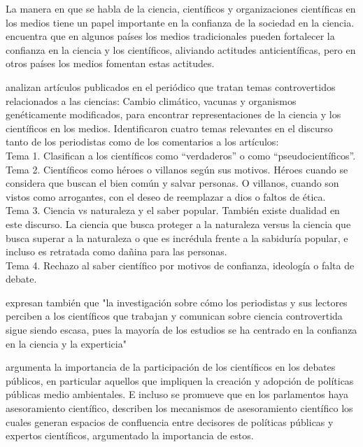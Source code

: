 \documentclass[11pt,a4paper]{article}
\begin{document}
\begin{enumerate}
		La manera en que se habla de la ciencia, científicos y organizaciones científicas en los medios tiene un papel importante en la confianza de la sociedad en la ciencia. \cite{Mede2022} encuentra que en algunos países los medios tradicionales pueden fortalecer  la confianza en la ciencia y los científicos, aliviando actitudes anticientíficas, pero en otros países los medios fomentan estas actitudes. 
		
		\cite{Donois2025} analizan artículos publicados en el periódico que tratan temas controvertidos relacionados a las ciencias: Cambio climático, vacunas y organismos genéticamente modificados, para encontrar representaciones de la ciencia y los científicos en los medios.  Identificaron cuatro temas relevantes en el discurso tanto de los periodistas como de los comentarios a los artículos: \\
		Tema 1. Clasifican a los científicos como ``verdaderos'' o como ``pseudocientíficos''. \\
		Tema 2. Científicos como héroes o villanos según sus motivos. Héroes cuando se considera que buscan el bien común y salvar personas. O villanos, cuando son vistos como arrogantes, con el deseo de reemplazar a dios o faltos de ética.\\
		Tema 3. Ciencia vs naturaleza y el saber popular. También existe dualidad en este discurso. La ciencia que busca proteger a la naturaleza versus la ciencia que busca superar a la naturaleza o que es incrédula frente a la sabiduría popular, e incluso es retratada como dañina para las personas.\\
		Tema 4. Rechazo al saber científico por motivos de confianza, ideología o falta de debate.
		
		\cite{Donois2025} expresan también que "la investigación sobre cómo los periodistas y sus lectores perciben a los científicos que trabajan y comunican sobre ciencia controvertida sigue siendo escasa, pues la mayoría de los estudios se ha centrado en la confianza en la ciencia y la experticia"
		
		 \cite{Peer2025} argumenta la importancia de la participación de los científicos en los debates públicos, en particular aquellos que impliquen la creación y adopción de políticas públicas medio ambientales. E incluso se promueve que en los parlamentos haya asesoramiento científico, \cite{SantillnGarca2021} 
		 describen los mecanismos de asesoramiento científico los cuales generan espacios de confluencia entre decisores de políticas públicas y expertos científicos, argumentado la importancia de estos. 
		

\end{enumerate}
\end{document}
